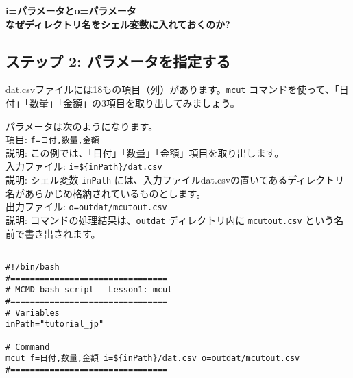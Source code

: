 {\setlength{\parindent}{0cm}
\textbf{i=パラメータとo=パラメータ}\\

\textbf{なぜディレクトリ名をシェル変数に入れておくのか?} \\

}

\subsection{ステップ 2: パラメータを指定する}

dat.csvファイルには18もの項目（列）があります。\verb|mcut| コマンドを使って、「日付」「数量」「金額」の3項目を取り出してみましょう。\\

{\setlength{\parindent}{0cm}

パラメータは次のようになります。 \\

項目: 		\verb|f=日付,数量,金額| \\
説明: この例では、「日付」「数量」「金額」項目を取り出します。 \\

入力ファイル: 		\verb|i=${inPath}/dat.csv| \\
説明: シェル変数 \verb|inPath| には、入力ファイルdat.csvの置いてあるディレクトリ名があらかじめ格納されているものとします。\\

出力ファイル: 	\verb|o=outdat/mcutout.csv| \\
説明: コマンドの処理結果は、\verb|outdat| ディレクトリ内に \verb|mcutout.csv| という名前で書き出されます。
}

\begin{verbatim}

#!/bin/bash
#================================
# MCMD bash script - Lesson1: mcut
#================================
# Variables
inPath="tutorial_jp"

# Command 
mcut f=日付,数量,金額 i=${inPath}/dat.csv o=outdat/mcutout.csv
#================================

\end{verbatim}

